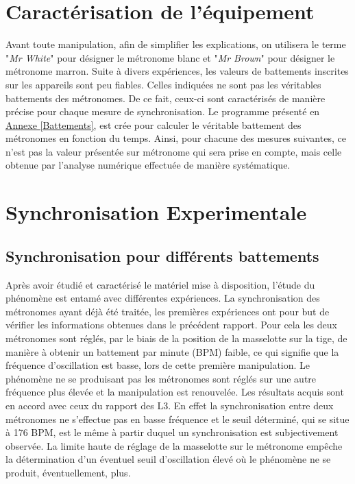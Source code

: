 \documentclass[a4paper,11pt]{report}
\begin{document}
\section{Caractérisation de l'équipement}
Avant toute manipulation, afin de simplifier les explications, on utilisera le terme "{\it Mr White}" pour désigner le métronome blanc et "{\it Mr Brown}" pour désigner le métronome marron. Suite à divers expériences, les valeurs de battements inscrites sur les appareils sont peu fiables. Celles indiquées ne sont pas les véritables battements des métronomes. De ce fait, ceux-ci sont caractérisés de manière précise pour chaque mesure de synchronisation. Le programme présenté en \underline{Annexe \ref{Battements}}, est crée pour calculer le véritable battement des métronomes en fonction du temps. Ainsi, pour chacune des mesures suivantes, ce n'est pas la valeur présentée sur métronome qui sera prise en compte, mais celle obtenue par l'analyse numérique effectuée de manière systématique.

\section{Synchronisation Experimentale}

\subsection{Synchronisation pour différents battements}
Après avoir étudié et caractérisé le matériel mise à disposition, l'étude du phénomène est entamé avec différentes expériences. La synchronisation des métronomes ayant déjà été traitée, les premières expériences ont pour but de vérifier les informations obtenues dans le précédent rapport. Pour cela les deux métronomes sont réglés, par le biais de la position de la masselotte sur la tige, de manière à obtenir un battement par minute (BPM) faible, ce qui signifie que la fréquence d'oscillation est basse, lors de cette première manipulation. Le phénomène ne se produisant pas les métronomes sont réglés sur une autre fréquence plus élevée et la manipulation est renouvelée. Les résultats acquis sont en accord avec ceux du rapport des L3\cite{ram}. En effet la synchronisation entre deux métronomes ne s'effectue pas en basse fréquence et le seuil déterminé, qui se situe à 176 BPM, est le même à partir duquel un synchronisation est subjectivement observée. La limite haute de réglage de la masselotte sur le métronome empêche la détermination d'un éventuel seuil d'oscillation élevé où le phénomène ne se produit, éventuellement, plus.\\
\end{document}
